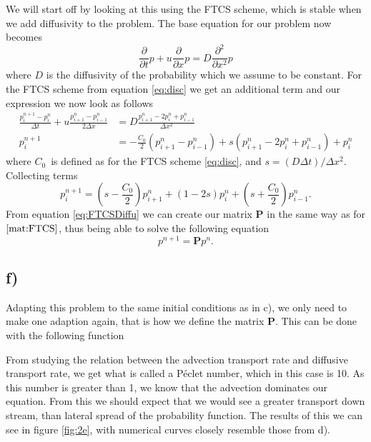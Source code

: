 \documentclass[10pt, a4paper]{amsart}
\begin{document}
We will start off by looking at this using the FTCS scheme, which is stable when we add diffusivity to the problem\cite{lev02}. The base equation for our problem now becomes
\begin{equation}
	\frac{\partial}{\partial t} p + u \frac{\partial}{\partial x}p = D\frac{\partial^2}{\partial x^2} p
\end{equation}
where $D$ is the diffusivity of the probability which we assume to be constant.
For the FTCS scheme from equation \ref{eq:disc} we get an additional term and our expression we now look as follows
\begin{align}
	\frac{p_i^{n+1}-p_i^n}{\Delta t} + u\frac{p_{i+1}^n - p_{i-1}^n}{2\Delta x} &= D\frac{p^n_{i+1} - 2p^n_i + p^n_{i-1}}{\Delta x^2}\\
	p_i^{n+1} &= -\frac{C_0}{2} \left(p_{i+1}^n - p_{i-1}^n\right) + 
	s\left(p^n_{i+1} - 2p^n_i + p^n_{i-1}\right) + p_i^n
\end{align}
where $C_0$ is defined as for the FTCS scheme \ref{eq:disc}, and $s = (D \Delta t)/\Delta x^2$. Collecting terms
\begin{equation}\label{eq:FTCSDiffu}
		p_i^{n+1} = \left(s - \frac{C_0}{2}\right)p_{i+1}^{n} 
		+ \left(1 - 2s\right)p_i^n 
		+ \left(s + \frac{C_0}{2}\right)p_{i-1}^n.
\end{equation}
From equation \ref{eq:FTCSDiffu} we can create our matrix $\mathbf{P}$ in the same way as for $\ref{mat:FTCS}$, thus being able to solve the following equation 
\begin{equation}
	p^{n+1} = \mathbf{P}p^n.
\end{equation}

\subsection{f)}
Adapting this problem to the same initial conditions as in c), we only need to make one adaption again, that is how we define the matrix $\mathbf{P}$. 
This can be done with the following function 

From studying the relation between the advection transport rate and diffusive transport rate, we get what is called a P\'eclet number, which in this case is 10. As this number is greater than 1, we know that the advection dominates our equation. From this we should expect that we would see a greater transport down stream, than lateral spread of the probability function. 
The results of this we can see in figure \ref{fig:2e}, with numerical curves closely resemble those from d). 
\end{document}
